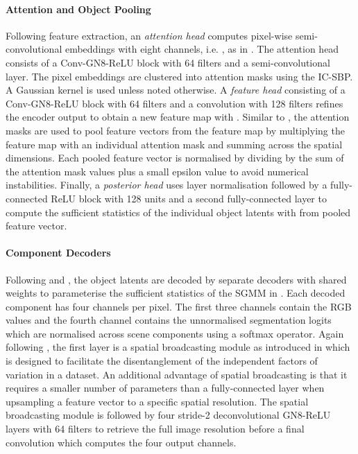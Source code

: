 \documentclass{article}
\begin{document}
\paragraph{Attention and Object Pooling}
Following feature extraction, an \emph{attention head} computes pixel-wise semi-convolutional embeddings  with eight channels, i.e. , as in \citet{novotny2018semi}.
The attention head consists of a  Conv-GN8-ReLU block with 64 filters and a  semi-convolutional layer.
The pixel embeddings are clustered into  attention masks  using the IC-SBP.
A Gaussian kernel  is used unless noted otherwise.
A \emph{feature head} consisting of a  Conv-GN8-ReLU block with 64 filters and a  convolution with 128 filters refines the encoder output  to obtain a new feature map  with .
Similar to \citet{locatello2020object}, the attention masks  are used to pool feature vectors from the feature map  by multiplying the feature map with an individual attention mask and summing across the spatial dimensions.
Each pooled feature vector is normalised by dividing by the sum of the attention mask values plus a small epsilon value to avoid numerical instabilities.
Finally, a \emph{posterior head} uses layer normalisation \citep{ba2016layer} followed by a fully-connected ReLU block with 128 units and a second fully-connected layer to compute the sufficient statistics of the individual object latents  with  from pooled feature vector.

\paragraph{Component Decoders}
Following \citet{greff2019multi} and \citet{locatello2020object}, the object latents are decoded by separate decoders with shared weights to parameterise the sufficient statistics of the SGMM in .
Each decoded component has four channels per pixel.
The first three channels contain the RGB values and the fourth channel contains the unnormalised segmentation logits which are normalised across scene components using a softmax operator. 
Again following \citet{locatello2020object}, the first layer is a spatial broadcasting module as introduced in \citet{watters2019spatial} which is designed to facilitate the disentanglement of the independent factors of variation in a dataset.
An additional advantage of spatial broadcasting is that it requires a smaller number of parameters than a fully-connected layer when upsampling a feature vector to a specific spatial resolution.
The spatial broadcasting module is followed by four stride-2 deconvolutional GN8-ReLU layers with 64 filters to retrieve the full image resolution before a final  convolution which computes the four output channels.
\end{document}
